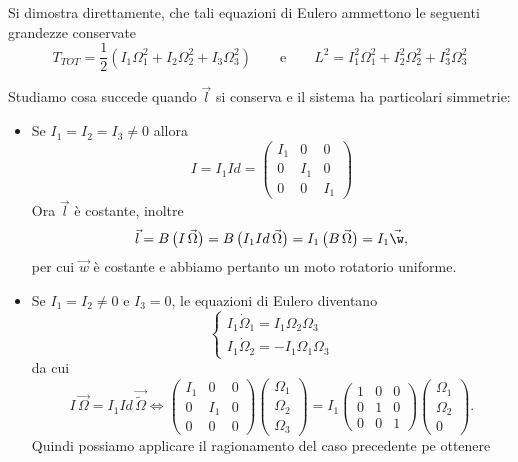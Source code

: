 \begin{oss}
	Si dimostra direttamente, che tali equazioni di Eulero ammettono le seguenti grandezze conservate
	\[
		T_{TOT} = \frac{1}{2}(I_1\Omega_1^2+I_2\Omega_2^2+I_3\Omega_3^2) \qquad\text{e}\qquad L^2 = I_1^2\Omega_1^2+I_2^2\Omega_2^2+I_3^2\Omega_3^2
	\]
\end{oss}
\noindent
Studiamo cosa succede quando \(\vec{l}\) si conserva e il sistema ha particolari simmetrie:
\begin{itemize}
	\item Se \(I_1=I_2=I_3\neq 0\) allora
	      \[
		      I = I_1 Id = 	\begin{pmatrix}
			      I_1 & 0   & 0    \\
			      0   & I_1 & 0    \\
			      0   & 0   & I_1
		      \end{pmatrix}
	      \]
	      Ora \(\vec{l}\) è costante, inoltre
	      \[
		      \vec{l} = B\,\big(I\,\vec{\Omega}\big) = B\,\big(I_1 Id\,\vec{\Omega}\big) = I_1\,\big(B\,\vec{\Omega}\big) = I_1 \vec{\w},
	      \]
	      per cui \(\vec{w}\) è costante e abbiamo pertanto un moto rotatorio uniforme.
	\item Se \(I_1=I_2\neq 0\) e \(I_3=0\), le equazioni di Eulero diventano
	      \[
		      \begin{cases}
			      I_1\dot{\Omega}_1 = I_1\Omega_2\Omega_3 \\
			      I_1\dot{\Omega}_2 = -I_1\Omega_1\Omega_3
		      \end{cases}
	      \]
	      da cui
	      \[
		      I\,\vec{\Omega} = I_1 Id\,\vec{\tilde{\Omega}} \iff \begin{pmatrix}I_1&0&0\\0&I_1&0\\0&0&0\end{pmatrix} \begin{pmatrix}\Omega_1\\\Omega_2\\\Omega_3\end{pmatrix} = I_1 \begin{pmatrix}1 & 0 & 0\\0 & 1 & 0\\0 & 0 & 1\end{pmatrix} \begin{pmatrix}\Omega_1\\\Omega_2\\0\end{pmatrix}.
	      \]
	      Quindi possiamo applicare il ragionamento del caso precedente pe ottenere

\end{itemize}

